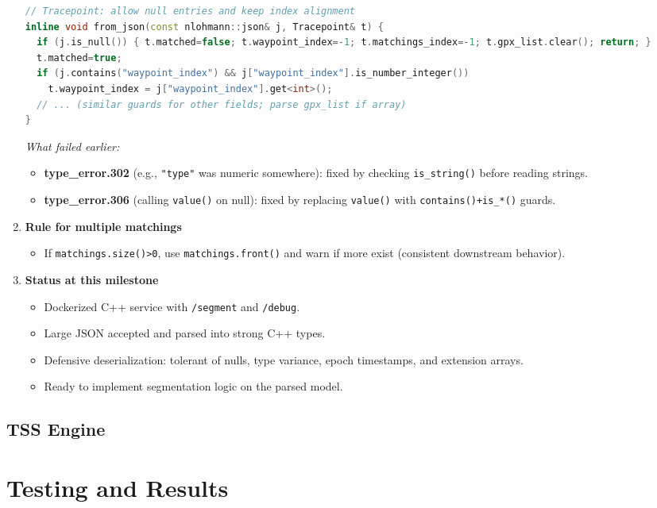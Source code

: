 \documentclass[11pt,twoside]{report}
\begin{document}
\begin{enumerate}
\begin{lstlisting}[language=C++]
// Tracepoint: allow null entries and keep index alignment
inline void from_json(const nlohmann::json& j, Tracepoint& t) {
  if (j.is_null()) { t.matched=false; t.waypoint_index=-1; t.matchings_index=-1; t.gpx_list.clear(); return; }
  t.matched=true;
  if (j.contains("waypoint_index") && j["waypoint_index"].is_number_integer())
    t.waypoint_index = j["waypoint_index"].get<int>();
  // ... (similar guards for other fields; parse gpx_list if array)
}
    \end{lstlisting}
	      \subitem \textit{What failed earlier:}
	      \begin{itemize}
		      \item \textbf{type\_error.302} (e.g., \texttt{"type"} was numeric somewhere): fixed by checking \texttt{is\_string()} before reading strings.
		      \item \textbf{type\_error.306} (calling \texttt{value()} on null): fixed by replacing \texttt{value()} with \texttt{contains()+is\_*()} guards.
	      \end{itemize}

	\item \textbf{Rule for multiple matchings}
	      \begin{itemize}
		      \item If \texttt{matchings.size()>0}, use \texttt{matchings.front()} and warn if more exist (consistent downstream behavior).
	      \end{itemize}

	\item \textbf{Status at this milestone}
	      \begin{itemize}
		      \item Dockerized C++ service with \texttt{/segment} and \texttt{/debug}.
		      \item Large JSON accepted and parsed into strong C++ types.
		      \item Defensive deserialization: tolerant of nulls, type variance, epoch timestamps, and extension arrays.
		      \item Ready to implement segmentation logic on the parsed model.
	      \end{itemize}
\end{enumerate}

\subsection{TSS Engine}

\section{Testing and Results}
\end{document}
